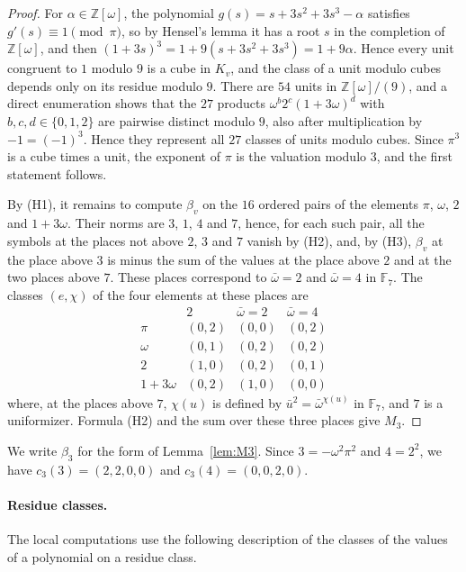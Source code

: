\documentclass[11pt]{article}
\newcommand{\Z}{\mathbb{Z}}
\newcommand{\F}{\mathbb{F}}
\begin{document}
\begin{proof}
For $\alpha\in\Z[\omega]$, the polynomial $g(s)=s+3s^2+3s^3-\alpha$ satisfies $g'(s)\equiv1\pmod\pi$, so by Hensel's lemma it has a root $s$ in the completion of $\Z[\omega]$, and then $(1+3s)^3=1+9(s+3s^2+3s^3)=1+9\alpha$. Hence every unit congruent to $1$ modulo $9$ is a cube in $K_v$, and the class of a unit modulo cubes depends only on its residue modulo $9$. There are $54$ units in $\Z[\omega]/(9)$, and a direct enumeration shows that the $27$ products $\omega^b2^c(1+3\omega)^d$ with $b,c,d\in\{0,1,2\}$ are pairwise distinct modulo $9$, also after multiplication by $-1=(-1)^3$. Hence they represent all $27$ classes of units modulo cubes. Since $\pi^3$ is a cube times a unit, the exponent of $\pi$ is the valuation modulo $3$, and the first statement follows.

By (H1), it remains to compute $\beta_v$ on the $16$ ordered pairs of the elements $\pi$, $\omega$, $2$ and $1+3\omega$. Their norms are $3$, $1$, $4$ and $7$, hence, for each such pair, all the symbols at the places not above $2$, $3$ and $7$ vanish by (H2), and, by (H3), $\beta_v$ at the place above $3$ is minus the sum of the values at the place above $2$ and at the two places above $7$. These places correspond to $\bar\omega=2$ and $\bar\omega=4$ in $\F_7$. The classes $(e,\chi)$ of the four elements at these places are
\[
\begin{array}{c|ccc}
 & 2 & \bar\omega=2 & \bar\omega=4\\\hline
\pi & (0,2) & (0,0) & (0,2)\\
\omega & (0,1) & (0,2) & (0,2)\\
2 & (1,0) & (0,2) & (0,1)\\
1+3\omega & (0,2) & (1,0) & (0,0)
\end{array}
\]
where, at the places above $7$, $\chi(u)$ is defined by $\bar u^2=\bar\omega^{\chi(u)}$ in $\F_7$, and $7$ is a uniformizer. Formula (H2) and the sum over these three places give $M_3$.
\end{proof}

We write $\beta_3$ for the form of Lemma~\ref{lem:M3}. Since $3=-\omega^2\pi^2$ and $4=2^2$, we have $c_3(3)=(2,2,0,0)$ and $c_3(4)=(0,0,2,0)$.

\paragraph{Residue classes.} The local computations use the following description of the classes of the values of a polynomial on a residue class.
\end{document}

